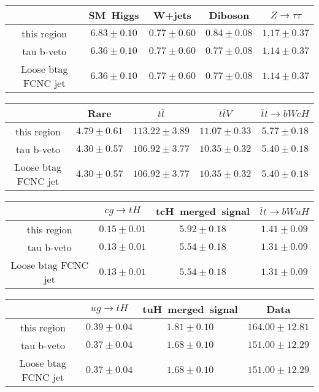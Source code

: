 \centering
\begin{tabular}{|c|c|c|c|c|} \hline
 & SM~Higgs & W+jets & Diboson & $Z\to \tau\tau$\\\hline
this region & $6.83\pm0.10$ & $0.77\pm0.60$ & $0.84\pm0.08$ & $1.17\pm0.37$\\\hline
tau b-veto & $6.36\pm0.10$ & $0.77\pm0.60$ & $0.77\pm0.08$ & $1.14\pm0.37$\\\hline
Loose btag FCNC jet & $6.36\pm0.10$ & $0.77\pm0.60$ & $0.77\pm0.08$ & $1.14\pm0.37$\\\hline
\end{tabular}
\begin{tabular}{|c|c|c|c|c|} \hline
 & Rare & $t\bar{t}$ & $t\bar{t}V$ & $\bar{t}t\to bWcH$\\\hline
this region & $4.79\pm0.61$ & $113.22\pm3.89$ & $11.07\pm0.33$ & $5.77\pm0.18$\\\hline
tau b-veto & $4.30\pm0.57$ & $106.92\pm3.77$ & $10.35\pm0.32$ & $5.40\pm0.18$\\\hline
Loose btag FCNC jet & $4.30\pm0.57$ & $106.92\pm3.77$ & $10.35\pm0.32$ & $5.40\pm0.18$\\\hline
\end{tabular}
\begin{tabular}{|c|c|c|c|} \hline
 & $cg\to tH$ & tcH~merged~signal & $\bar{t}t\to bWuH$\\\hline
this region & $0.15\pm0.01$ & $5.92\pm0.18$ & $1.41\pm0.09$\\\hline
tau b-veto & $0.13\pm0.01$ & $5.54\pm0.18$ & $1.31\pm0.09$\\\hline
Loose btag FCNC jet & $0.13\pm0.01$ & $5.54\pm0.18$ & $1.31\pm0.09$\\\hline
\end{tabular}
\begin{tabular}{|c|c|c|c|} \hline
 & $ug\to tH$ & tuH~merged~signal & Data\\\hline
this region & $0.39\pm0.04$ & $1.81\pm0.10$ & $164.00\pm12.81$\\\hline
tau b-veto & $0.37\pm0.04$ & $1.68\pm0.10$ & $151.00\pm12.29$\\\hline
Loose btag FCNC jet & $0.37\pm0.04$ & $1.68\pm0.10$ & $151.00\pm12.29$\\\hline
\end{tabular}
